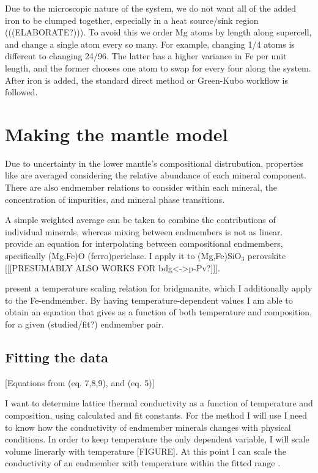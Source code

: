 Due to the microscopic nature of the system, we do not want all of the added iron to be clumped together, especially in a heat source/sink region (((ELABORATE?))). To avoid this we order Mg atoms by length along supercell, and change a single atom every so many. For example, changing 1/4 atoms is different to changing 24/96. The latter has a higher variance in Fe per unit length, and the former chooses one atom to swap for every four along the system. After iron is added, the standard direct method or Green-Kubo workflow is followed.


\section{Making the mantle model}

Due to uncertainty in the lower mantle's compositional distrubution, properties like \tcs are averaged considering the relative abundance of each mineral component. There are also endmember relations to consider within each mineral, the concentration of impurities, and mineral phase transitions.  

A simple weighted average can be taken to combine the contributions of individual minerals, whereas mixing between endmembers is not as linear. \citet{Ohta2017} provide an equation for interpolating \cs between compositional endmembers, specifically (Mg,Fe)O (ferro)periclase. I apply it to (Mg,Fe)SiO$_3$ perovskite [[[PRESUMABLY ALSO WORKS FOR bdg<->p-Pv?]]]. 

\citet{Okuda2017} present a temperature scaling relation for bridgmanite, which I additionally apply to the Fe-endmember. By having temperature-dependent values I am able to obtain an equation that gives \tcs as a function of both temperature and composition, for a given (studied/fit?) endmember pair.

\subsection{Fitting the data} 

[Equations from \cite{Ohta2017} (eq. 7,8,9), and \cite{Okuda2017} (eq. 5)]

I want to determine lattice thermal conductivity as a function of temperature and composition, 
using calculated and fit constants. For the method I will use I need to know how the conductivity of endmember minerals changes with physical conditions. In order to keep temperature the only dependent variable, I will scale volume linerarly with temperature [FIGURE]. At this point I can scale the conductivity of an endmember with temperature within the fitted range \citep{Okuda2017}.

